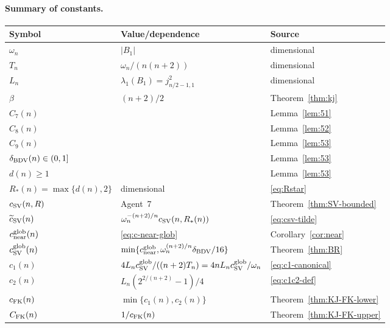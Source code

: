 \paragraph{Summary of constants.}
\renewcommand{\arraystretch}{1.25}
\begin{center}
\begin{tabular}{|l|l|l|}
\hline
Symbol & Value/dependence & Source \\
\hline
$\omega_n$ & $|B_1|$ & dimensional \\
$T_n$ & $\omega_n/(n(n+2))$ & dimensional \\
$L_n$ & $\lambda_1(B_1)=j_{n/2-1,1}^2$ & dimensional \\
$\beta$ & $(n+2)/2$ & Theorem~\ref{thm:kj} \\
$C_7(n)$ & \cite[Lem.~5.1]{BDV} & Lemma~\ref{lem:51} \\
$C_8(n)$ & \cite[Lem.~5.2]{BDV} & Lemma~\ref{lem:52} \\
$C_9(n)$ & \cite[Lem.~5.3]{BDV} & Lemma~\ref{lem:53} \\
$\delta_{\rm BDV}(n)\in(0,1]$ & \cite[Lem.~5.3]{BDV} & Lemma~\ref{lem:53} \\
$d(n)\ge 1$ & \cite[Lem.~5.3]{BDV} & Lemma~\ref{lem:53} \\
$R_*(n)=\max\{d(n),2\}$ & dimensional & \eqref{eq:Rstar} \\
$c_{\rm SV}(n,R)$ & Agent~7 & Theorem~\ref{thm:SV-bounded} \\
$\widetilde c_{\rm SV}(n)$ & $\omega_n^{-(n+2)/n}c_{\rm SV}(n,R_*(n))$ & \eqref{eq:csv-tilde} \\
$c_{\rm near}^{\rm glob}(n)$ & \eqref{eq:c-near-glob} & Corollary~\ref{cor:near} \\
$c_{\rm SV}^{\rm glob}(n)$ & $\min\{c_{\rm near}^{\rm glob},\omega_n^{(n+2)/n}\delta_{\rm BDV}/16\}$ & Theorem~\ref{thm:BR} \\
$c_1(n)$ & $4L_n c_{\rm SV}^{\rm glob}/((n+2)T_n)=4nL_n c_{\rm SV}^{\rm glob}/\omega_n$ & \eqref{eq:c1-canonical} \\
$c_2(n)$ & $L_n(2^{2/(n+2)}-1)/4$ & \eqref{eq:c1c2-def} \\
$c_{\rm FK}(n)$ & $\min\{c_1(n),c_2(n)\}$ & Theorem~\ref{thm:KJ-FK-lower} \\
$C_{\rm FK}(n)$ & $1/c_{\rm FK}(n)$ & Theorem~\ref{thm:KJ-FK-upper} \\
\hline
\end{tabular}
\end{center}

